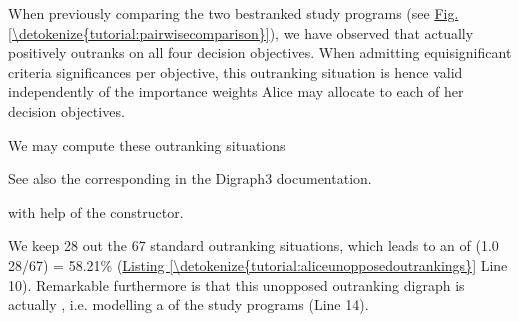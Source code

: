 \documentclass[a4paper,12pt,english]{sphinxhowto}
\begin{document}
When previously comparing the two best\sphinxhyphen{}ranked study programs (see \hyperref[\detokenize{tutorial:pairwisecomparison}]{Fig.\@ \ref{\detokenize{tutorial:pairwisecomparison}}}), we have observed that  actually positively outranks  on all four decision objectives. When admitting equi\sphinxhyphen{}significant criteria significances per objective, this outranking situation is hence valid independently of the importance weights Alice may allocate to each of her decision objectives.

We may compute these  outranking situations %
\begin{footnote}[25]\sphinxAtStartFootnote
See also the corresponding  in the Digraph3 documentation.
%
\end{footnote} with help of the  constructor.
\def\sphinxLiteralBlockLabel{\label{\detokenize{tutorial:aliceunopposedoutrankings}}}
\begin{sphinxVerbatim}[commandchars=\\\{\},numbers=left,firstnumber=1,stepnumber=1]
   
  
\end{sphinxVerbatim}

We keep 28 out the 67 standard outranking situations, which leads to an  of (1.0 \sphinxhyphen{} 28/67) = 58.21\% (\hyperref[\detokenize{tutorial:aliceunopposedoutrankings}]{Listing \ref{\detokenize{tutorial:aliceunopposedoutrankings}}} Line 10). Remarkable furthermore is that this unopposed outranking digraph  is actually , i.e. modelling a  of the study programs (Line 14).
\end{document}
